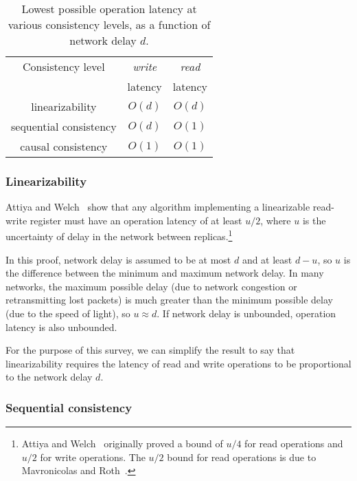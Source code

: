 \documentclass[a4paper,twocolumn,10pt]{article}
\begin{document}
\begin{table}
    \centering
    \begin{tabular}{ccc}
        Consistency level      & \textit{write} & \textit{read} \\
                               & latency        & latency \\[3pt] \hline \noalign{\vspace{6pt}}
        linearizability        & $O(d)$         & $O(d)$  \\[3pt]
        sequential consistency & $O(d)$         & $O(1)$  \\[3pt]
        causal consistency     & $O(1)$         & $O(1)$  \\[3pt] \hline
    \end{tabular}
    \caption{Lowest possible operation latency at various consistency levels, as a function of
    network delay $d$.}
    \label{tab:op-latency}
\end{table}

\subsubsection{Linearizability}

Attiya and Welch~\cite{Attiya1994gw} show that any algorithm implementing a linearizable read-write
register must have an operation latency of at least $u/2$, where $u$ is the uncertainty of delay in
the network between replicas.\footnote{Attiya and Welch~\cite{Attiya1994gw} originally proved a
bound of $u/4$ for read operations and $u/2$ for write operations. The $u/2$ bound for read
operations is due to Mavronicolas and Roth~\cite{Mavronicolas1999eb}.}

In this proof, network delay is assumed to be at most $d$ and at least $d-u$, so $u$ is the
difference between the minimum and maximum network delay. In many networks, the maximum possible
delay (due to network congestion or retransmitting lost packets) is much greater than the minimum
possible delay (due to the speed of light), so $u \approx d$. If network delay is unbounded,
operation latency is also unbounded.

For the purpose of this survey, we can simplify the result to say that linearizability requires the
latency of read and write operations to be proportional to the network delay $d$.

\subsubsection{Sequential consistency}
\end{document}
